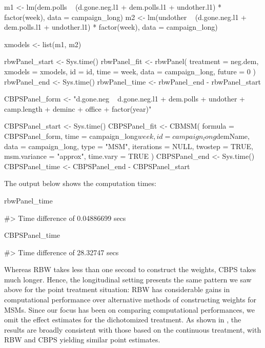 \begin{Schunk}
\begin{Sinput}
m1 <-
  lm(dem.polls ~ (d.gone.neg.l1 + dem.polls.l1 + undother.l1) * factor(week),
     data = campaign_long)
m2 <-
  lm(undother ~ (d.gone.neg.l1 + dem.polls.l1 + undother.l1) * factor(week),
     data = campaign_long)

xmodels <- list(m1, m2)

rbwPanel_start <- Sys.time()
rbwPanel_fit <- rbwPanel(
  treatment = neg.dem,
  xmodels = xmodels,
  id = id,
  time = week,
  data = campaign_long,
  future = 0
)
rbwPanel_end <- Sys.time()
rbwPanel_time <- rbwPanel_end - rbwPanel_start
\end{Sinput}
\end{Schunk}

\begin{Schunk}
\begin{Sinput}
CBPSPanel_form <-
  "d.gone.neg ~ d.gone.neg.l1 + dem.polls + undother + camp.length + deminc + office + factor(year)"

CBPSPanel_start <- Sys.time()
CBPSPanel_fit <-
  CBMSM(
    formula = CBPSPanel_form,
    time = campaign_long$week,
    id = campaign_long$demName,
    data = campaign_long,
    type = "MSM",
    iterations = NULL,
    twostep = TRUE,
    msm.variance = "approx",
    time.vary = TRUE
  )
CBPSPanel_end <- Sys.time()
CBPSPanel_time <- CBPSPanel_end - CBPSPanel_start
\end{Sinput}
\end{Schunk}

The output below shows the computation times:

\begin{Schunk}
\begin{Sinput}
rbwPanel_time
\end{Sinput}
\begin{Soutput}
#> Time difference of 0.04886699 secs
\end{Soutput}
\begin{Sinput}
CBPSPanel_time
\end{Sinput}
\begin{Soutput}
#> Time difference of 28.32747 secs
\end{Soutput}
\end{Schunk}

Whereas RBW takes less than one second to construct the weights, CBPS
takes much longer. Hence, the longitudinal setting presents the same
pattern we saw above for the point treatment situation: RBW has
considerable gains in computational performance over alternative methods
of constructing weights for MSMs. Since our focus has been on comparing
computational performances, we omit the effect estimates for the
dichotomized treatment. As shown in
\citet{zhouResidualBalancingMethod2020a}, the results are broadly
consistent with those based on the continuous treatment, with RBW and
CBPS yielding similar point estimates.


